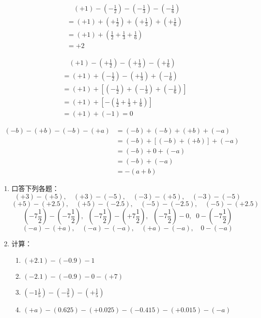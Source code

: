 \begin{solution}
 \begin{align*}
  &\quad   (+1)-\left(-\frac{1}{2}\right)-\left(-\frac{1}{3}\right)-\left(-\frac{1}{6}\right)\\
    &= (+1)+\left(+\frac{1}{2}\right)+\left(+\frac{1}{3}\right)+\left(+\frac{1}{6}\right)\tag{减法法则}\\
&=(+1)+\left(\frac{1}{2}+\frac{1}{3}+\frac{1}{6}\right)\tag{同号相加法则}\\
&=+2
 \end{align*}   

 \begin{align*}
    &\quad    (+1)-\left(+\frac{1}{2}\right)-\left(+\frac{1}{3}\right)-\left(+\frac{1}{6}\right)\\
    &=(+1)+\left(-\frac{1}{2}\right)-\left(+\frac{1}{3}\right)+\left(-\frac{1}{6}\right)\tag{减法法则}\\
    &=(+1)+\left[ \left(-\frac{1}{2}\right)+\left(-\frac{1}{3}\right) +\left(-\frac{1}{6}\right)\right]  \tag{加法结合律}\\
&=(+1)+\left[-\left(\frac{1}{2}+\frac{1}{3}+\frac{1}{6}\right)\right]\tag{同号相加法则}  \\
&=(+1)+(-1)=0  \tag{相反数性质}
 \end{align*}   

 \begin{align*}
    (-b)-(+b)-(-b)-(+a)&=(-b)+(-b)+(+b)+(-a)\tag{减法法则}\\
    &=(-b)+[(-b)+(+b)]+(-a)  \tag{加法结合律}\\
    &=(-b)+0+(-a) \tag{相反数意义}\\
&=(-b)+(-a) \tag{零的特征}\\
&=-(a+b)  \tag{同号相加法则}    
 \end{align*}   
\end{solution}

\begin{ex}
  \begin{enumerate}
      \item 口答下列各题：
\[(+3)-(+5),\quad (+3)-(-5),\quad (-3)-(+5),\quad (-3)-(-5) \]
\[(+5)-(+2.5),\quad  (+5)-(-2.5),\quad (-5)-(-2.5),\quad (-5)-(+2.5)\]
\[\left(-7\frac{1}{2}\right)-\left(-7\frac{1}{2}\right),\;\; \left(-7\frac{1}{2}\right)-\left(+7\frac{1}{2}\right),\;\; \left(-7\frac{1}{2}\right)-0,\;\; 0-\left(-7\frac{1}{2}\right) \]
\[(-a)-(+a),\quad (-a)-(-a),\quad (+a)-(-a),\quad 0-(-a)\]

\item 计算：
\begin{enumerate}
    \item $(+2.1)-(-0.9)-1$
    \item $(-2.1)-(-0.9)-0-(+7)$
    \item $\left(-1\frac{1}{5}\right)-\left(-\frac{3}{5}\right)-\left(+\frac{1}{5}\right)$
    \item $(+a)-(0.625)-(+0.025)-(-0.415)-(+0.015)-(-a)$
\end{enumerate}
  \end{enumerate}  
\end{ex}

